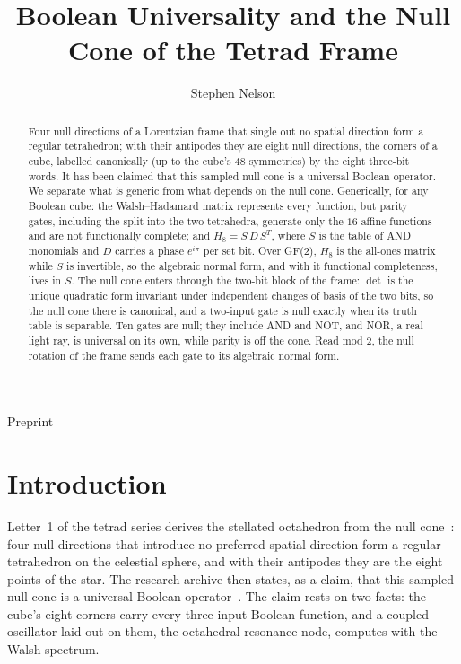 \documentclass[twocolumn]{iopjournal}
\renewcommand{\articletype}[1]{%
  {\vspace*{-8mm}\noindent \Large \sf Preprint}\par
  \vspace*{6mm}\noindent{\scriptsize \sf{\bfseries \MakeUppercase{#1}}}}
\begin{document}
\articletype{Paper}

\title{Boolean Universality and the Null Cone of the Tetrad Frame}

\author{Stephen Nelson}



\begin{abstract}
Four null directions of a Lorentzian frame that single out no spatial
direction form a regular tetrahedron; with their antipodes they are
eight null directions, the corners of a cube, labelled canonically (up
to the cube's $48$ symmetries) by the eight three-bit words. It has
been claimed that this sampled null cone is a universal Boolean
operator. We separate what is generic from what depends on the null
cone. Generically, for any Boolean cube: the Walsh--Hadamard matrix
represents every function, but parity gates, including the split into
the two tetrahedra, generate only the $16$ affine functions and are not
functionally complete; and $H_8 = S\,D\,S^T$, where $S$ is the table of
AND monomials and $D$ carries a phase $e^{i\pi}$ per set bit. Over
GF(2), $H_8$ is the all-ones matrix while $S$ is invertible, so the
algebraic normal form, and with it functional completeness, lives in
$S$. The null cone enters through the two-bit block of the frame:
$\det$ is the unique quadratic form invariant under independent
changes of basis of the two bits, so the null cone there is canonical,
and a two-input gate is null exactly when its truth table is separable.
Ten gates are null; they include AND and NOT, and NOR, a real light
ray, is universal on its own, while parity is off the cone. Read mod 2,
the null rotation of the frame sends each gate to its algebraic normal
form.
\end{abstract}



\section{Introduction}

Letter~1 of the tetrad series derives the stellated octahedron from
the null cone~\cite{NelsonL1}: four null directions that introduce no
preferred spatial direction form a regular tetrahedron on the
celestial sphere, and with their antipodes they are the eight points
of the star. The research archive then states, as a claim, that this
sampled null cone is a universal Boolean operator~\cite{NelsonPixel}.
The claim rests on two facts: the cube's eight corners carry every
three-input Boolean function, and a coupled oscillator laid out on
them, the octahedral resonance node, computes with the Walsh spectrum.
\end{document}
